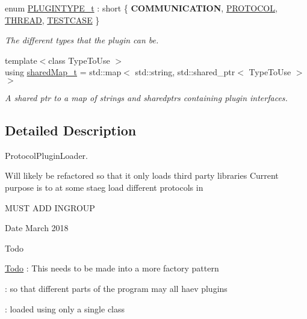 \begin{DoxyCompactItemize}
\item 
enum \mbox{\hyperlink{namespacePluginLoader_a7b1358e9577b47b5d4b16231a5a81699}{P\+L\+U\+G\+I\+N\+T\+Y\+P\+E\+\_\+t}} \+: short \{ {\bfseries C\+O\+M\+M\+U\+N\+I\+C\+A\+T\+I\+ON}, 
\mbox{\hyperlink{namespacePluginLoader_a7b1358e9577b47b5d4b16231a5a81699a49d6e411a493a1204917082fd1a08c79}{P\+R\+O\+T\+O\+C\+OL}}, 
\mbox{\hyperlink{namespacePluginLoader_a7b1358e9577b47b5d4b16231a5a81699ae9ed1359f21cca42327aba8d43fa3262}{T\+H\+R\+E\+AD}}, 
\mbox{\hyperlink{namespacePluginLoader_a7b1358e9577b47b5d4b16231a5a81699aeb34f9db5e9d294497d8af01af0ec338}{T\+E\+S\+T\+C\+A\+SE}}
 \}
\begin{DoxyCompactList}\small\item\em The different types that the plugin can be. \end{DoxyCompactList}\item 
{\footnotesize template$<$class Type\+To\+Use $>$ }\\using \mbox{\hyperlink{namespacePluginLoader_a8e505caea20d9f45155939545d29f6ba}{shared\+Map\+\_\+t}} = std\+::map$<$ std\+::string, std\+::shared\+\_\+ptr$<$ Type\+To\+Use $>$ $>$
\begin{DoxyCompactList}\small\item\em A shared ptr to a map of strings and sharedptr\textquotesingle{}s containing plugin interfaces. \end{DoxyCompactList}\end{DoxyCompactItemize}


\subsection{Detailed Description}
Protocol\+Plugin\+Loader. 

Will likely be refactored so that it only loads third party libraries Current purpose is to at some staeg load different protocols in

M\+U\+ST A\+DD I\+N\+G\+R\+O\+UP

\begin{DoxyDate}{Date}
March 2018 
\end{DoxyDate}
\begin{DoxyRefDesc}{Todo}
\item[\mbox{\hyperlink{todo__todo000012}{Todo}}]\+: This needs to be made into a more factory pattern 

\+: so that different parts of the program may all haev plugins 

\+: loaded using only a single class \end{DoxyRefDesc}


